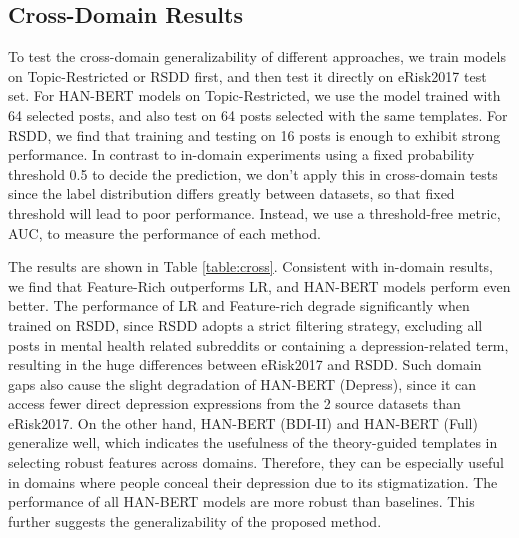 
\subsection{Cross-Domain Results}

To test the cross-domain generalizability of different approaches, we train models on Topic-Restricted or RSDD first, and then test it directly on eRisk2017 test set. For HAN-BERT models on Topic-Restricted, we use the model trained with 64 selected posts, and also test on 64 posts selected with the same templates. For RSDD, we find that training and testing on 16 posts is enough to exhibit strong performance. In contrast to in-domain experiments using a fixed probability threshold 0.5 to decide the prediction, we don't apply this in cross-domain tests since the label distribution differs greatly between datasets, so that fixed threshold will lead to poor performance. Instead, we use a threshold-free metric, AUC, to measure the performance of each method.

The results are shown in Table \ref{table:cross}. Consistent with in-domain results, we find that Feature-Rich outperforms LR, and HAN-BERT models perform even better. The performance of LR and Feature-rich degrade significantly when trained on RSDD, since RSDD adopts a strict filtering strategy, excluding all posts in mental health related subreddits or containing a depression-related term, resulting in the huge differences between eRisk2017 and RSDD. Such domain gaps also cause the slight degradation of HAN-BERT (Depress), since it can access fewer direct depression expressions from the 2 source datasets than eRisk2017. On the other hand, HAN-BERT (BDI-II) and HAN-BERT (Full) generalize well, which indicates the usefulness of the theory-guided templates in selecting robust features across domains. Therefore, they can be especially useful in domains where people conceal their depression due to its stigmatization. The performance of all HAN-BERT models are more robust than baselines. This further suggests the generalizability of the proposed method.

